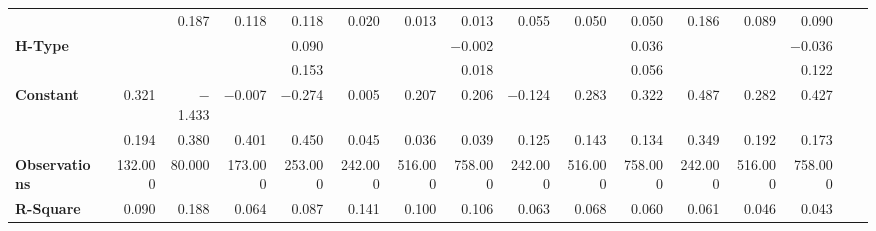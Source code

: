 \begin{tabular}{@{\extracolsep{5pt}}lrrrrrrrrrrrrrrr}
{\bf } & \phantom{***} & 0.187\phantom{\phantom{)}***} & 0.118\phantom{\phantom{)}***} & 0.118\phantom{\phantom{)}***} & 0.020\phantom{\phantom{)}***} & 0.013\phantom{\phantom{)}***} & 0.013\phantom{\phantom{)}***} & 0.055\phantom{\phantom{)}***} & 0.050\phantom{\phantom{)}***} & 0.050\phantom{\phantom{)}***} & 0.186\phantom{\phantom{)}***} & 0.089\phantom{\phantom{)}***} & 0.090\phantom{\phantom{)}***} \\
{\bf H-Type} & \phantom{***} & \phantom{***} & \phantom{***} & 0.090\phantom{\phantom{)}***} & \phantom{***} & \phantom{***} & $-$0.002\phantom{\phantom{)}***} & \phantom{***} & \phantom{***} & 0.036\phantom{\phantom{)}***} & \phantom{***} & \phantom{***} & $-$0.036\phantom{\phantom{)}***} \\
{\bf } & \phantom{***} & \phantom{***} & \phantom{***} & 0.153\phantom{\phantom{)}***} & \phantom{***} & \phantom{***} & 0.018\phantom{\phantom{)}***} & \phantom{***} & \phantom{***} & 0.056\phantom{\phantom{)}***} & \phantom{***} & \phantom{***} & 0.122\phantom{\phantom{)}***} \\
{\bf Constant} & 0.321\phantom{\phantom{)}***} & $-$1.433\phantom{\phantom{)}***} & $-$0.007\phantom{\phantom{)}***} & $-$0.274\phantom{\phantom{)}***} & 0.005\phantom{\phantom{)}***} & 0.207\phantom{\phantom{)}***} & 0.206\phantom{\phantom{)}***} & $-$0.124\phantom{\phantom{)}***} & 0.283\phantom{\phantom{)}***} & 0.322\phantom{\phantom{)}***} & 0.487\phantom{\phantom{)}***} & 0.282\phantom{\phantom{)}***} & 0.427\phantom{\phantom{)}***} \\
{\bf } & 0.194\phantom{\phantom{)}***} & 0.380\phantom{\phantom{)}***} & 0.401\phantom{\phantom{)}***} & 0.450\phantom{\phantom{)}***} & 0.045\phantom{\phantom{)}***} & 0.036\phantom{\phantom{)}***} & 0.039\phantom{\phantom{)}***} & 0.125\phantom{\phantom{)}***} & 0.143\phantom{\phantom{)}***} & 0.134\phantom{\phantom{)}***} & 0.349\phantom{\phantom{)}***} & 0.192\phantom{\phantom{)}***} & 0.173\phantom{\phantom{)}***} \\
{\bf Observations} & 132.000\phantom{\phantom{)}***} & 80.000\phantom{\phantom{)}***} & 173.000\phantom{\phantom{)}***} & 253.000\phantom{\phantom{)}***} & 242.000\phantom{\phantom{)}***} & 516.000\phantom{\phantom{)}***} & 758.000\phantom{\phantom{)}***} & 242.000\phantom{\phantom{)}***} & 516.000\phantom{\phantom{)}***} & 758.000\phantom{\phantom{)}***} & 242.000\phantom{\phantom{)}***} & 516.000\phantom{\phantom{)}***} & 758.000\phantom{\phantom{)}***} \\
{\bf R-Square} & 0.090\phantom{***} & 0.188\phantom{***} & 0.064\phantom{***} & 0.087\phantom{***} & 0.141\phantom{***} & 0.100\phantom{***} & 0.106\phantom{***} & 0.063\phantom{***} & 0.068\phantom{***} & 0.060\phantom{***} & 0.061\phantom{***} & 0.046\phantom{***} & 0.043\phantom{***} \\
\hline
\end{tabular}
